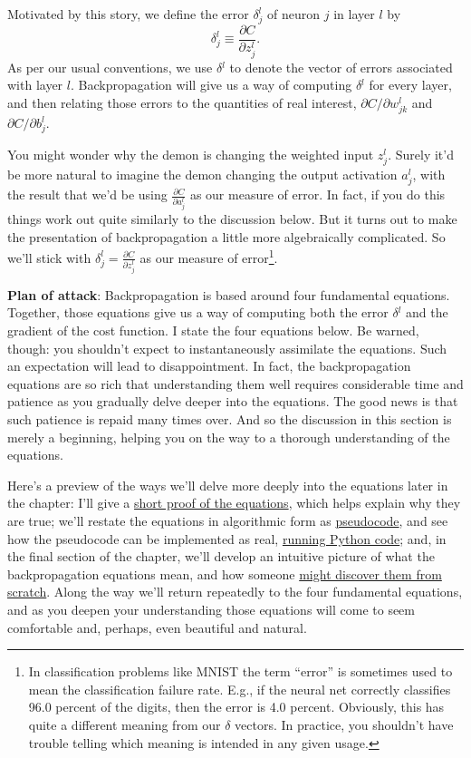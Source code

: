 \documentclass[a4paper,twoside,10pt]{book}
\begin{document}
Motivated by this story, we define the error $\delta^l_j$ of neuron $j$ in layer $l$ by
\begin{equation}
	\delta^l_j\equiv\frac{\partial{}C}{\partial{}z^l_j}.\label{eq:29}
\end{equation}
As per our usual conventions, we use $\delta{}^l$ to denote the vector of errors associated with layer $l$. Backpropagation will give us a way of computing $\delta{}^l$ for every layer, and then relating those errors to the quantities of real interest, $\partial{}C/\partial{}w^l_{jk}$ and $\partial{}C/\partial{}b^l_j$.

You might wonder why the demon is changing the weighted input $z^l_j$. Surely it'd be more natural to imagine the demon changing the output activation $a^l_j$, with the result that we'd be using $\frac{\partial{}C}{\partial{}a^l_j}$ as our measure of error. In fact, if you do this things work out quite similarly to the discussion below. But it turns out to make the presentation of backpropagation a little more algebraically complicated. So we'll stick with $\delta^l_j=\frac{\partial{}C}{\partial{}z^l_j}$ as our measure of error\footnote{In classification problems like MNIST the term ``error'' is sometimes used to mean the classification failure rate. E.g., if the neural net correctly classifies 96.0 percent of the digits, then the error is 4.0 percent. Obviously, this has quite a different meaning from our $\delta$ vectors. In practice, you shouldn't have trouble telling which meaning is intended in any given usage.}.

\textbf{Plan of attack}: Backpropagation is based around four fundamental equations. Together, those equations give us a way of computing both the error $\delta{}^l$ and the gradient of the cost function. I state the four equations below. Be warned, though: you shouldn't expect to instantaneously assimilate the equations. Such an expectation will lead to disappointment. In fact, the backpropagation equations are so rich that understanding them well requires considerable time and patience as you gradually delve deeper into the equations. The good news is that such patience is repaid many times over. And so the discussion in this section is merely a beginning, helping you on the way to a thorough understanding of the equations.

Here's a preview of the ways we'll delve more deeply into the equations later in the chapter: I'll give a \hyperref[sec:2.5]{short proof of the equations}, which helps explain why they are true; we'll restate the equations in algorithmic form as \hyperref[sec:2.6]{pseudocode}, and see how the pseudocode can be implemented as real, \hyperref[sec:2.7]{running Python code}; and, in the final section of the chapter, we'll develop an intuitive picture of what the backpropagation equations mean, and how someone \hyperref[sec:2.9]{might discover them from scratch}. Along the way we'll return repeatedly to the four fundamental equations, and as you deepen your understanding those equations will come to seem comfortable and, perhaps, even beautiful and natural.
\end{document}

